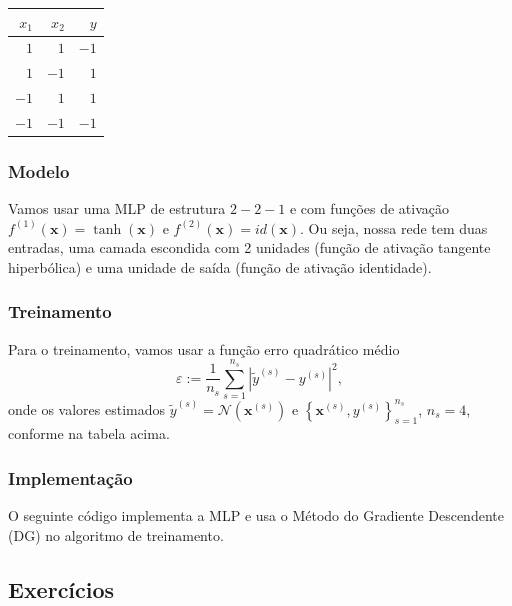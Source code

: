 \begin{center}
  \begin{tabular}{rr|r}
    $x_1$ & $x_2$ & $y$ \\\hline
    $1$ & $1$ & $-1$ \\
    $1$ & $-1$ & $1$ \\
    $-1$ & $1$ & $1$ \\
    $-1$ & $-1$ & $-1$ \\\hline
  \end{tabular}
\end{center}

\subsubsection{Modelo}

Vamos usar uma MLP de estrutura $2-2-1$ e com funções de ativação $f^{(1)}(\pmb{x}) = \tanh(\pmb{x})$ e $f^{(2)}(\pmb{x}) = id(\pmb{x})$. Ou seja, nossa rede tem duas entradas, uma camada escondida com 2 unidades (função de ativação tangente hiperbólica) e uma unidade de saída (função de ativação identidade).

\subsubsection{Treinamento}

Para o treinamento, vamos usar a função erro quadrático médio
\begin{equation}
  \varepsilon := \frac{1}{n_s}\sum_{s=1}^{n_s}\left|\tilde{y}^{(s)} - y^{(s)}\right|^2,
\end{equation}
onde os valores estimados $\tilde{y}^{(s)} = \mathcal{N}\left(\pmb{x}^{(s)}\right)$ e $\left\{\pmb{x}^{(s)}, y^{(s)}\right\}_{s=1}^{n_s}$, $n_s=4$, conforme na tabela acima.

\subsubsection{Implementação}

O seguinte código implementa a MLP e usa o Método do Gradiente Descendente (DG) no algoritmo de treinamento.



\subsection{Exercícios}


